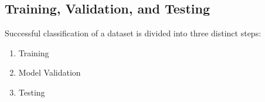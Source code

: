 %
%
%

%




\subsection{Training, Validation, and Testing}\label{lit:loocv}
Successful classification of a dataset is divided into three distinct steps:
\begin{enumerate}
	\item Training
	\item Model Validation
	\item Testing
\end{enumerate}


